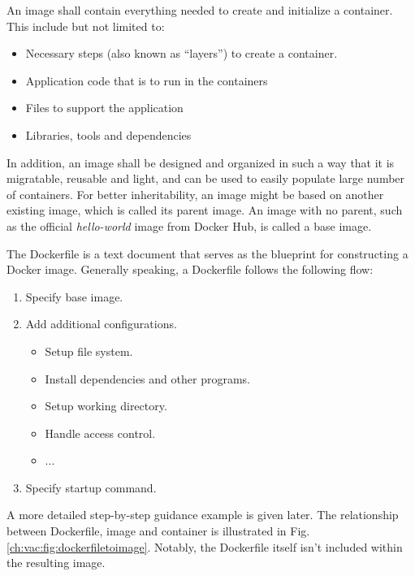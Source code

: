 An image shall contain everything needed to create and initialize a container. This include but not limited to:
\begin{itemize}
  \item Necessary steps (also known as ``layers'') to create a container.
  \item Application code that is to run in the containers
  \item Files to support the application
  \item Libraries, tools and dependencies
\end{itemize}
In addition, an image shall be designed and organized in such a way that it is migratable, reusable and light, and can be used to easily populate large number of containers. For better inheritability, an image might be based on another existing image, which is called its parent image. An image with no parent, such as the official \textit{hello-world} image from Docker Hub, is called a base image.

The Dockerfile is a text document that serves as the blueprint for constructing a Docker image. Generally speaking, a Dockerfile follows the following flow:
\begin{enumerate}[(1)]
	\item Specify base image.
	\item Add additional configurations.
	\begin{itemize}
		\item Setup file system.
		\item Install dependencies and other programs.
		\item Setup working directory.
		\item Handle access control.
		\item ...
	\end{itemize}
	\item Specify startup command.
\end{enumerate}
A more detailed step-by-step guidance example is given later. The relationship between Dockerfile, image and container is illustrated in Fig. \ref{ch:vac:fig:dockerfiletoimage}. Notably, the Dockerfile itself isn't included within the resulting image.

